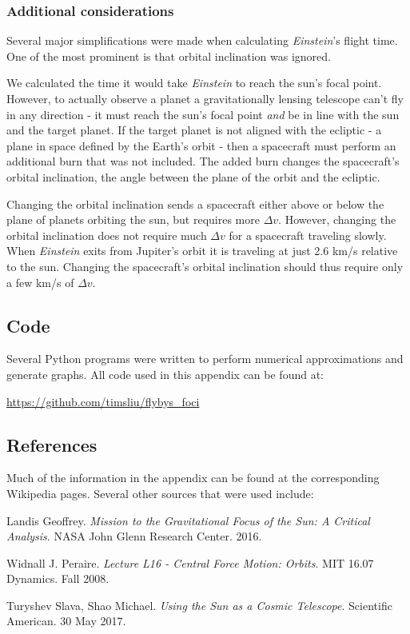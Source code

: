 \documentclass[12pt]{article} %
\begin{document}
\subsubsection{Additional considerations}
Several major simplifications were made when calculating \textit{Einstein}'s flight time. One of the most prominent is that orbital inclination was ignored.

We calculated the time it would take \textit{Einstein} to reach the sun's focal point. However, to actually observe a planet a gravitationally lensing telescope can't fly in any direction - it must reach the sun's focal point \textit{and} be in line with the sun and the target planet. If the target planet is not aligned with the ecliptic - a plane in space defined by the Earth's orbit - then a spacecraft must perform an additional burn that was not included. The added burn changes the spacecraft's orbital inclination, the angle between the plane of the orbit and the ecliptic. 

Changing the orbital inclination sends a spacecraft either above or below the plane of planets orbiting the sun, but requires more $\Delta v$. However, changing the orbital inclination does not require much $\Delta v$ for a spacecraft traveling slowly. When \textit{Einstein} exits from Jupiter's orbit it is traveling at just 2.6 km/s relative to the sun. Changing the spacecraft's orbital inclination should thus require only a few km/s of $\Delta v$.

\subsection{Code}
Several Python programs were written to perform numerical approximations and generate graphs. All code used in this appendix can be found at:

\url{https://github.com/timsliu/flybys_foci}

\subsection{References}

Much of the information in the appendix can be found at the corresponding Wikipedia pages. Several other sources that were used include:

Landis Geoffrey. \textit{Mission to the Gravitational Focus of the Sun: A Critical Analysis}. NASA John Glenn Research Center. 2016.

Widnall J. Peraire. \textit{Lecture L16 - Central Force Motion: Orbits}. MIT 16.07 Dynamics. Fall 2008.

Turyshev Slava, Shao Michael. \textit{Using the Sun as a Cosmic Telescope}. Scientific American. 30 May 2017.
\end{document}
